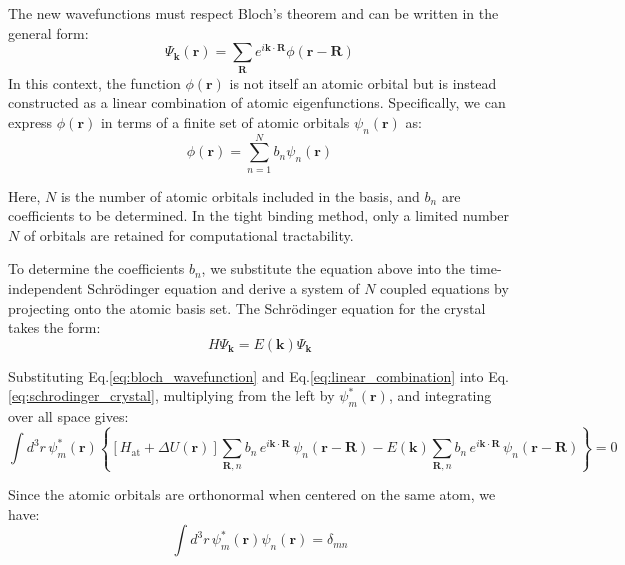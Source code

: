 The new wavefunctions must respect Bloch’s theorem and can be written in the general form:
\begin{equation}
	\Psi_{\mathbf{k}}(\mathbf{r}) = \sum_{\mathbf{R}} e^{i\mathbf{k} \cdot \mathbf{R}} \phi(\mathbf{r} - \mathbf{R})
	\label{eq:bloch_wavefunction}
\end{equation}
In this context, the function \( \phi(\mathbf{r}) \) is not itself an atomic orbital but is instead constructed as a linear combination of atomic eigenfunctions. Specifically, we can express \( \phi(\mathbf{r}) \) in terms of a finite set of atomic orbitals \( \psi_n(\mathbf{r}) \) as:
\begin{equation}
	\phi(\mathbf{r}) = \sum_{n=1}^{N} b_n \psi_n(\mathbf{r})
	\label{eq:linear_combination}
\end{equation}

\noindent
Here, \( N \) is the number of atomic orbitals included in the basis, and \( b_n \) are coefficients to be determined. In the tight binding method, only a limited number \( N \) of orbitals are retained for computational tractability.

To determine the coefficients \( b_n \), we substitute the equation above into the time-independent Schrödinger equation and derive a system of \( N \) coupled equations by projecting onto the atomic basis set. The Schrödinger equation for the crystal takes the form:
\begin{equation}
	H\Psi_{\mathbf{k}} = E(\mathbf{k}) \Psi_{\mathbf{k}}
	\label{eq:schrodinger_crystal}
\end{equation}

\noindent
Substituting Eq.\eqref{eq:bloch_wavefunction} and Eq.\eqref{eq:linear_combination}  into Eq.\eqref{eq:schrodinger_crystal}, multiplying from the left by \( \psi_m^*(\mathbf{r}) \), and integrating over all space gives:
\begin{equation}
	\int d^3 r \, \psi_m^*(\mathbf{r}) \left\{
	\left[ H_{\text{at}} + \Delta U(\mathbf{r}) \right]
	\sum_{\mathbf{R},n} b_n \, e^{i \mathbf{k} \cdot \mathbf{R}} \, \psi_n(\mathbf{r} - \mathbf{R})
	- E(\mathbf{k}) \sum_{\mathbf{R},n} b_n \, e^{i \mathbf{k} \cdot \mathbf{R}} \, \psi_n(\mathbf{r} - \mathbf{R})
	\right\} = 0
\end{equation}

\noindent
Since the atomic orbitals are orthonormal when centered on the same atom, we have:
\begin{equation}
	\int d^3r \, \psi_m^*(\mathbf{r}) \psi_n(\mathbf{r}) = \delta_{mn}
\end{equation}


